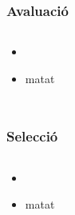 \documentclass{beamer}
\begin{document}
\begin{frame}
	\frametitle{Avaluació}
	\begin{columns}[c]
		\begin{itemize}
			\item 
				\pause
			\item matat
		\end{itemize}
	\end{columns}
\end{frame}

\begin{frame}
	\frametitle{Selecció}
	\begin{columns}[c]
		\begin{itemize}
			\item 
				\pause
			\item matat
		\end{itemize}
	\end{columns}
\end{frame}
\end{document}
